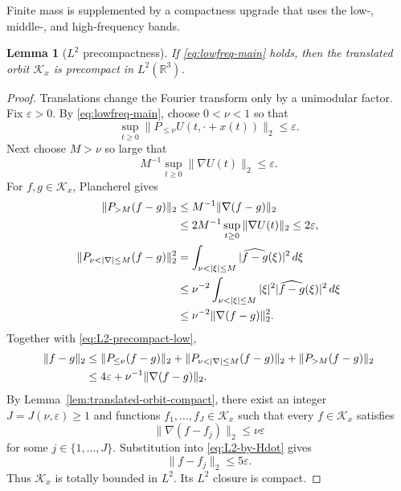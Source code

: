 \documentclass[preprint,12pt]{elsarticle}
\numberwithin{equation}{section}
\newtheorem{lemma}[theorem]{Lemma}
\theoremstyle{remark}
\newcommand{\R}{\mathbb R}
\newcommand{\dd}{\,d}
\begin{document}
Finite mass is supplemented by a compactness upgrade that uses the low-, middle-, and high-frequency bands.

\begin{lemma}[$L^2$ precompactness]\label{lem:lowfreq-L2-precompact}
If \eqref{eq:lowfreq-main} holds, then the translated orbit $\mathcal K_x$ is precompact in $L^2(\R^3)$.
\end{lemma}

\begin{proof}
Translations change the Fourier transform only by a unimodular factor.  Fix $\varepsilon>0$.  By \eqref{eq:lowfreq-main}, choose $0<\nu<1$ so that
\begin{equation}\label{eq:L2-precompact-low}
  \sup_{t\ge0}
  \|P_{\le\nu}U(t,\cdot+x(t))\|_2
  \le\varepsilon.
\end{equation}
Next choose $M>\nu$ so large that
\begin{equation*}
  M^{-1}\sup_{t\ge0}\|\nabla U(t)\|_2
  \le\varepsilon.
\end{equation*}
For $f,g\in\mathcal K_x$, Plancherel gives
\begin{align*}
  \|P_{>M}(f-g)\|_2
  &\le M^{-1}\|\nabla(f-g)\|_2\notag\\
  &\le2M^{-1}\sup_{t\ge0}\|\nabla U(t)\|_2
  \le2\varepsilon,
  \\
  \|P_{\nu<|\nabla|\le M}(f-g)\|_2^2
  &=\int_{\nu<|\xi|\le M}|\widehat{f-g}(\xi)|^2\dd\xi\notag\\
  &\le\nu^{-2}
  \int_{\nu<|\xi|\le M}|\xi|^2|\widehat{f-g}(\xi)|^2\dd\xi\notag\\
  &\le\nu^{-2}\|\nabla(f-g)\|_2^2.
  \notag
\end{align*}
Together with \eqref{eq:L2-precompact-low},
\begin{align}
  \|f-g\|_2
  &\le\|P_{\le\nu}(f-g)\|_2
  +\|P_{\nu<|\nabla|\le M}(f-g)\|_2
  +\|P_{>M}(f-g)\|_2\notag\\
  &\le4\varepsilon+\nu^{-1}\|\nabla(f-g)\|_2.
  \label{eq:L2-by-Hdot}
\end{align}
By Lemma~\ref{lem:translated-orbit-compact}, there exist an integer $J=J(\nu,\varepsilon)\ge1$ and functions $f_1,\dots,f_J\in\mathcal K_x$ such that every $f\in\mathcal K_x$ satisfies
\[
  \|\nabla(f-f_j)\|_2\le\nu\varepsilon
\]
for some $j\in\{1,\dots,J\}$.  Substitution into \eqref{eq:L2-by-Hdot} gives
\[
  \|f-f_j\|_2\le5\varepsilon.
\]
Thus $\mathcal K_x$ is totally bounded in $L^2$.  Its $L^2$ closure is compact.
\end{proof}
\end{document}
